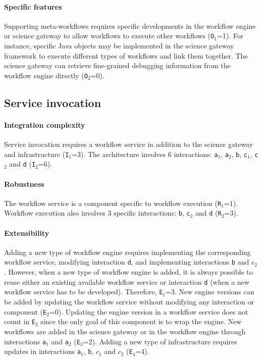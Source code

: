 \documentclass[preprint,3p,twocolumn]{elsarticle}
\newcommand{\correction}[1]{\color{blue}#1\color{black}\xspace}
\begin{document}
\paragraph{Specific features} Supporting meta-workflows requires
specific developments in the workflow engine or science gateway to
allow workflows to execute other workflows (\texttt{O$_1$}=1). For
instance, specific Java objects may be implemented in the science
gateway framework to execute different types of workflows and link
them together.  The science gateway can
retrieve fine-grained debugging information from the workflow engine
directly (\texttt{O$_2$}=0).

\subsection{Service invocation}

\paragraph{Integration complexity} Service invocation requires a workflow service
in addition to the science gateway and infrastructure
(\texttt{I$_1$}=3). The architecture involves 6 interactions:
\texttt{a$_1$}, \texttt{a$_2$}, \texttt{b}, \texttt{c$_1$},
\texttt{c$_2$} and \texttt{d} (\texttt{I$_2$}=6).

\paragraph{Robustness} The workflow service is a component specific to
workflow execution (\texttt{R$_1$}=1). Workflow execution also
involves 3 specific interactions: \texttt{b},
\texttt{c$_2$} and \texttt{d} (\texttt{R$_2$}=3).

\paragraph{Extensibility} Adding a new type of workflow engine
requires implementing the corresponding workflow service,  modifying
interaction \texttt{d}, and  implementing interactions \texttt{b} and
\texttt{$c_2$}. \correction{However, when a new type of workflow engine is added, it is always possible to reuse either an existing available workflow service or interaction \texttt{d} (when a new workflow service has to be developed). Therefore, \texttt{E$_1$}=3}. New engine versions can be added by
updating the workflow service without modifying any interaction or
component (\texttt{E$_2$}=0). Updating the engine version in a
workflow service does not count in \texttt{E$_2$} since the only goal of this component
is to wrap the engine.  New workflows are added in the science gateway
or in the workflow engine through interactions \texttt{a$_1$} and
\texttt{a$_2$} (\texttt{E$_3$}=2). Adding a new type of infrastructure
requires updates in interactions \texttt{a$_1$}, \texttt{b},
\texttt{$c_1$} and \texttt{$c_2$} (\texttt{E$_4$}=4).
\end{document}
